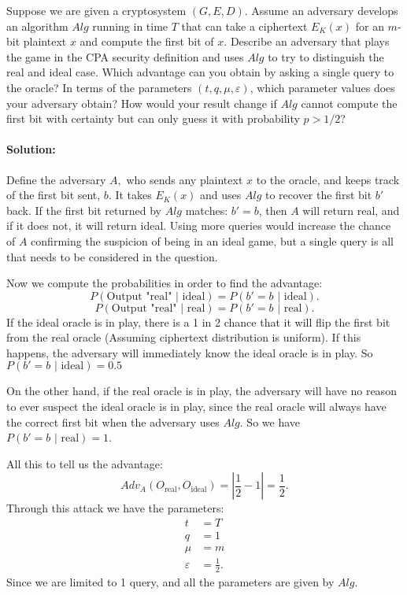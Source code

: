 \documentclass{article}
\begin{document}
\begin{exe}
Suppose we are given a cryptosystem $(G, E, D).$ Assume an adversary develops an algorithm $Alg$ running in time $T$ that can take a ciphertext $E_K(x)$ for an $m$-bit plaintext $x$ and compute the first bit of $x$. Describe an adversary that plays the game in the CPA security definition and uses $Alg$ to try to distinguish the real and ideal case. Which advantage can you obtain by asking a single query to the oracle? In terms of the parameters $(t, q, \mu, \varepsilon)$, which parameter values does your adversary obtain? How would your result change if $Alg$ cannot compute the first bit with certainty but can only guess it with probability $p > 1/2$?
\end{exe}
\paragraph{Solution: }Define the adversary $A,$ who sends any plaintext $x$ to the oracle, and keeps track of the first bit sent, $b$. It takes $E_K(x)$ and uses $Alg$ to recover the first bit $b'$ back. If the first bit returned by $Alg$ matches: $b'=b$, then $A$ will return real, and if it does not, it will return ideal. Using more queries would increase the chance of $A$ confirming the suspicion of being in an ideal game, but a single query is all that needs to be considered in the question.

Now we compute the probabilities in order to find the advantage:
\[
P(\text{Output "real" | ideal})=P(b'=b\text{ | ideal})
.\] \[
P(\text{Output "real" | real}) =P(b'=b\text{ | real})
.\] 
If the ideal oracle is in play, there is a 1 in 2 chance that it will flip the first bit from the real oracle (Assuming ciphertext distribution is uniform). If this happens, the adversary will immediately know the ideal oracle is in play. So $P(b'=b\text{ | ideal})=0.5$

On the other hand, if the real oracle is in play, the adversary will have no reason to ever suspect the ideal oracle is in play, since the real oracle will always have the correct first bit when the adversary uses $Alg$. So we have $P(b'=b\text{ | real})=1$.

All this to tell us the advantage:
\[
    Adv_A(O_{\text{real}},O_{\text{ideal}})= \left|\frac{1}{2}-1\right|=\frac{1}{2}
.\] 
Through this attack we have the parameters:
\begin{align*}
    t&= T \\
    q&= 1 \\
    \mu&= m \\
    \varepsilon&=\frac{1}{2}
.\end{align*}
Since we are limited to 1 query, and all the parameters are given by $Alg$.
\end{document}
